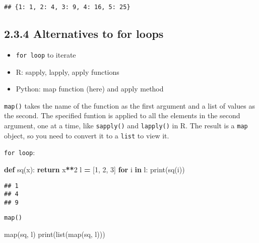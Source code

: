 \documentclass[]{book}
\newenvironment{Shaded}{\begin{snugshade}}{\end{snugshade}}
\newcommand{\BuiltInTok}[1]{#1}
\newcommand{\ControlFlowTok}[1]{\textcolor[rgb]{0.13,0.29,0.53}{\textbf{#1}}}
\newcommand{\DecValTok}[1]{\textcolor[rgb]{0.00,0.00,0.81}{#1}}
\newcommand{\KeywordTok}[1]{\textcolor[rgb]{0.13,0.29,0.53}{\textbf{#1}}}
\newcommand{\NormalTok}[1]{#1}
\newcommand{\OperatorTok}[1]{\textcolor[rgb]{0.81,0.36,0.00}{\textbf{#1}}}
\providecommand{\tightlist}{%
  \setlength{\itemsep}{0pt}\setlength{\parskip}{0pt}}
\theoremstyle{definition}
\theoremstyle{definition}
\theoremstyle{definition}
\theoremstyle{remark}
\begin{document}
\begin{verbatim}
## {1: 1, 2: 4, 3: 9, 4: 16, 5: 25}
\end{verbatim}

\hypertarget{alternatives-to-for-loops}{%
\subsection{2.3.4 Alternatives to for
loops}\label{alternatives-to-for-loops}}

\begin{itemize}
\tightlist
\item
  \texttt{for\ loop} to iterate
\item
  R: sapply, lapply, apply functions
\item
  Python: map function (here) and apply method
\end{itemize}

\texttt{map()} takes the name of the function as the first argument and
a list of values as the second. The specified funtion is applied to all
the elements in the second argument, one at a time, like
\texttt{sapply()} and \texttt{lapply()} in R. The result is a
\texttt{map} object, so you need to convert it to a \texttt{list} to
view it.

\texttt{for\ loop}:

\begin{Shaded}
\begin{Highlighting}[]
\KeywordTok{def}\NormalTok{ sq(x):}
    \ControlFlowTok{return}\NormalTok{ x}\OperatorTok{**}\DecValTok{2}
\NormalTok{l }\OperatorTok{=}\NormalTok{ [}\DecValTok{1}\NormalTok{, }\DecValTok{2}\NormalTok{, }\DecValTok{3}\NormalTok{]}
\ControlFlowTok{for}\NormalTok{ i }\KeywordTok{in}\NormalTok{ l:}
    \BuiltInTok{print}\NormalTok{(sq(i))}
    
\end{Highlighting}
\end{Shaded}

\begin{verbatim}
## 1
## 4
## 9
\end{verbatim}

\texttt{map()}

\begin{Shaded}
\begin{Highlighting}[]
\BuiltInTok{map}\NormalTok{(sq, l)}
\BuiltInTok{print}\NormalTok{(}\BuiltInTok{list}\NormalTok{(}\BuiltInTok{map}\NormalTok{(sq, l)))}
\end{Highlighting}
\end{Shaded}
\end{document}
